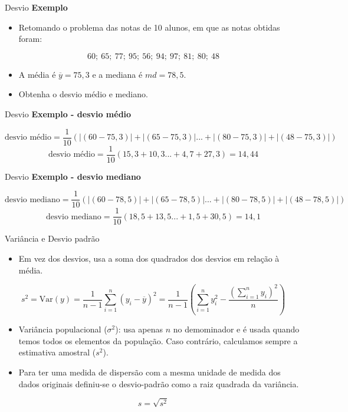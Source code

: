 \documentclass[
  ignorenonframetext,
  serif,
  professionalfont,
  usenames,
  dvipsnames,
  aspectratio = 169]{beamer}
\providecommand{\tightlist}{%
  \setlength{\itemsep}{0pt}\setlength{\parskip}{0pt}}
\renewcommand{\tightlist}{%
  \setlength{\itemsep}{0\baselineskip}
  \setlength{\parskip}{0.25\baselineskip}
}
\begin{document}
\begin{frame}{Desvio}
\protect\hypertarget{desvio}{}
\textbf{Exemplo}

\begin{itemize}
\tightlist
\item
  Retomando o problema das notas de 10 alunos, em que as notas obtidas
  foram:
\end{itemize}

\[60;\ 65;\ 77;\ 95;\ 56;\ 94;\ 97;\ 81;\ 80;\ 48\]

\begin{itemize}
\item
  A média é \(\overline{y} = 75,3\) e a mediana é \(md = 78,5\).
\item
  Obtenha o desvio médio e mediano.
\end{itemize}
\end{frame}

\begin{frame}{Desvio}
\protect\hypertarget{desvio-1}{}
\textbf{Exemplo - desvio médio}

\[
\text{desvio m\'edio} = \frac{1}{10}
       \left ( |(60 - 75,3)| + |(65 - 75,3)| ... + |(80 - 75,3)| + |(48 - 75,3)| \right )
\] \[
\text{desvio m\'edio} = \frac{1}{10}
       \left ( 15,3 + 10,3 ... + 4,7  + 27,3  \right ) = 14,44
\]
\end{frame}

\begin{frame}{Desvio}
\protect\hypertarget{desvio-2}{}
\textbf{Exemplo - desvio mediano}

\[
\text{desvio mediano} = \frac{1}{10}
       \left ( |(60 - 78,5)| + |(65 - 78,5)| ... + |(80 - 78,5)| + |(48 - 78,5)| \right )
\] \[
\text{desvio mediano} = \frac{1}{10}
       \left ( 18,5 + 13,5 ... + 1,5  + 30,5  \right ) = 14,1
\]
\end{frame}

\begin{frame}{Variância e Desvio padrão}
\protect\hypertarget{variuxe2ncia-e-desvio-padruxe3o}{}
\begin{itemize}
\tightlist
\item
  Em vez dos desvios, usa a soma dos quadrados dos desvios em relação à
  média.
\end{itemize}

\[
s^2 = \textrm{Var}(y) = \frac{1}{n - 1} \sum_{i = 1}^{n} (y_i - \overline{y})^2 = \frac{1}{n - 1}\left(\sum_{i = 1}^{n} y_i^2 - \frac{(\sum_{i = 1}^{n} y_i)^2}{n}\right)
\]

\begin{itemize}
\item
  Variância populacional (\(\sigma^2\)): usa apenas \(n\) no demominador
  e é usada quando temos todos os elementos da população. Caso
  contrário, calculamos sempre a estimativa amostral (\(s^2\)).
\item
  Para ter uma medida de dispersão com a mesma unidade de medida dos
  dados originais definiu-se o desvio-padrão como a raiz quadrada da
  variância.
\end{itemize}

\[
s = \sqrt{s^2}
\]
\end{frame}
\end{document}
